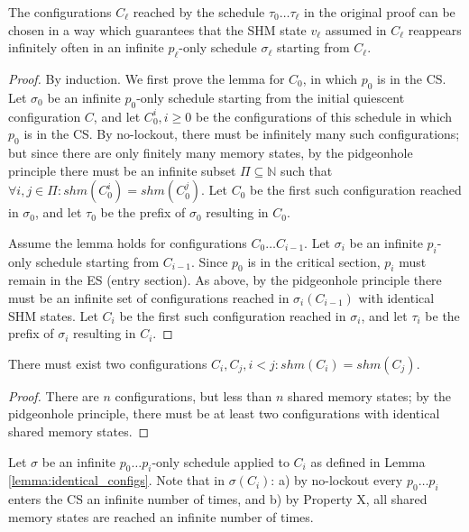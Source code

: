 \begin{lemma} \label{lemma:p_i_only}
The configurations $C_\ell$ reached by the schedule $\tau_0 \ldots \tau_\ell$
in the original proof can be chosen in a way which guarantees that the SHM
state $v_\ell$ assumed in $C_\ell$ reappears infinitely often in an infinite
$p_\ell$-only schedule $\sigma_\ell$ starting from $C_\ell$.
\end{lemma}

\begin{proof}
By induction.
We first prove the lemma for $C_0$, in which $p_0$ is in the CS. Let $\sigma_0$
be an infinite $p_0$-only schedule starting from the initial quiescent configuration
$C$, and let $C_0^i, i \geq 0$ be the configurations of this schedule in which
$p_0$ is in the CS. By no-lockout, there must be infinitely many such configurations;
but since there are only finitely many memory states, by the pidgeonhole principle
there must be an infinite subset $\Pi \subseteq \mathbb{N}$ such that 
$\forall i, j \in \Pi: shm(C_0^i) = shm(C_0^j)$. Let $C_0$ be the first such
configuration reached in $\sigma_0$, and let $\tau_0$ be the prefix of
$\sigma_0$ resulting in $C_0$.

Assume the lemma holds for configurations $C_0 \ldots C_{i-1}$.
Let $\sigma_i$ be an infinite $p_i$-only schedule starting from $C_{i-1}$.
Since $p_0$ is in the critical section, $p_i$ must remain in the ES (entry
section). As above, by the pidgeonhole principle there must be an infinite
set of configurations reached in $\sigma_i(C_{i-1})$ with identical SHM
states. Let $C_i$ be the first such configuration reached in $\sigma_i$,
and let $\tau_i$ be the prefix of $\sigma_i$ resulting in $C_i$.
\end{proof}

\begin{lemma} \label{lemma:identical_configs}
There must exist two configurations $C_i, C_j, i < j: shm(C_i) = shm(C_j)$.
\end{lemma}

\begin{proof}
There are $n$ configurations, but less than $n$ shared memory states; by the
pidgeonhole principle, there must be at least two configurations with identical
shared memory states.
\end{proof}

\begin{definition} \label{def:sigma}
Let $\sigma$ be an infinite $p_0 \ldots p_i$-only schedule applied to $C_i$
as defined in Lemma \ref{lemma:identical_configs}. Note that in $\sigma(C_i)$: 
a) by no-lockout every $p_0 \ldots p_i$ enters the CS an infinite number of times,
and b) by Property X, all shared memory states are 
reached an infinite number of times.
\end{definition}

